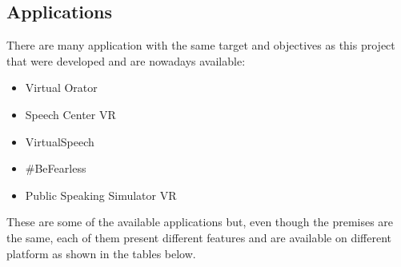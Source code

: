 \subsection{Applications}
There are many application with the same target and objectives as this project that were developed and are nowadays available:
\begin{itemize}
	\item Virtual Orator
	\item Speech Center VR
	\item VirtualSpeech
	\item \#BeFearless
	\item Public Speaking Simulator VR
\end{itemize}
These are some of the available applications but, even though the premises are the same, each of them present different features and are available on different platform as shown in the tables below.

